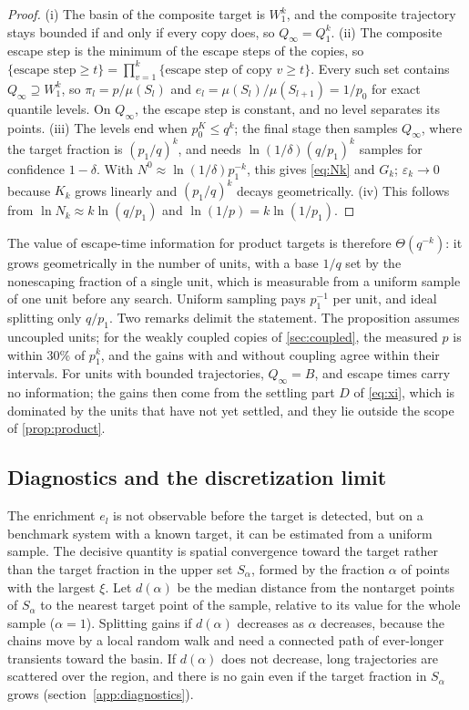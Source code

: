 \begin{proof}
(i) The basin of the composite target is $W_1^k$, and the composite trajectory stays bounded if and only if every copy does, so $Q_\infty=Q_1^k$. (ii) The composite escape step is the minimum of the escape steps of the copies, so $\{\text{escape step}\ge t\}=\prod_{v=1}^k\{\text{escape step of copy } v\ge t\}$. Every such set contains $Q_\infty\supseteq W_1^k$, so $\pi_l=p/\mu(S_l)$ and $e_l=\mu(S_l)/\mu(S_{l+1})=1/p_0$ for exact quantile levels. On $Q_\infty$, the escape step is constant, and no level separates its points. (iii) The levels end when $p_0^{K}\le q^k$; the final stage then samples $Q_\infty$, where the target fraction is $(p_1/q)^k$, and needs $\ln(1/\delta)(q/p_1)^k$ samples for confidence $1-\delta$. With $N^0\approx\ln(1/\delta)p_1^{-k}$, this gives \eqref{eq:Nk} and $G_k$; $\varepsilon_k\to0$ because $K_k$ grows linearly and $(p_1/q)^k$ decays geometrically. (iv) This follows from $\ln N_k\approx k\ln(q/p_1)$ and $\ln(1/p)=k\ln(1/p_1)$.
\end{proof}

The value of escape-time information for product targets is therefore $\Theta(q^{-k})$: it grows geometrically in the number of units, with a base $1/q$ set by the nonescaping fraction of a single unit, which is measurable from a uniform sample of one unit before any search. Uniform sampling pays $p_1^{-1}$ per unit, and ideal splitting only $q/p_1$. Two remarks delimit the statement. The proposition assumes uncoupled units; for the weakly coupled copies of \cref{sec:coupled}, the measured $p$ is within 30\% of $p_1^k$, and the gains with and without coupling agree within their intervals. For units with bounded trajectories, $Q_\infty=B$, and escape times carry no information; the gains then come from the settling part $D$ of \eqref{eq:xi}, which is dominated by the units that have not yet settled, and they lie outside the scope of \cref{prop:product}.

\subsection{Diagnostics and the discretization limit}\label{sec:diagnostics}

The enrichment $e_l$ is not observable before the target is detected, but on a benchmark system with a known target, it can be estimated from a uniform sample. The decisive quantity is spatial convergence toward the target rather than the target fraction in the upper set $S_\alpha$, formed by the fraction $\alpha$ of points with the largest $\xi$. Let $d(\alpha)$ be the median distance from the nontarget points of $S_\alpha$ to the nearest target point of the sample, relative to its value for the whole sample ($\alpha=1$). Splitting gains if $d(\alpha)$ decreases as $\alpha$ decreases, because the chains move by a local random walk and need a connected path of ever-longer transients toward the basin. If $d(\alpha)$ does not decrease, long trajectories are scattered over the region, and there is no gain even if the target fraction in $S_\alpha$ grows (section~\ref{app:diagnostics}).

